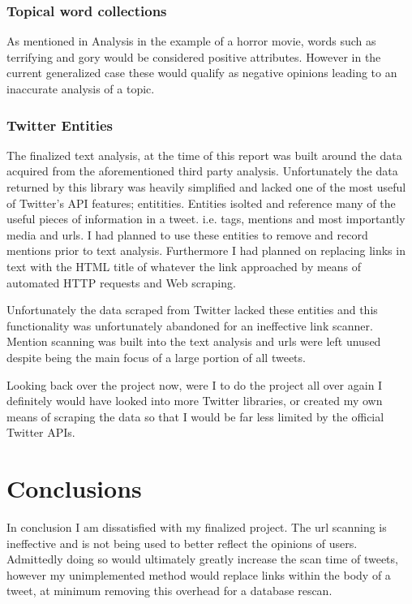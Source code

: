 \documentclass[12pt,a4paper]{report}
\begin{document}
    \subsection{Topical word collections}
    As mentioned in Analysis in the example of a horror movie, words such as terrifying and gory would be considered positive attributes. However in the current generalized case these would qualify as negative opinions leading to an inaccurate analysis of a topic.
    \subsection{Twitter Entities}
    The finalized text analysis, at the time of this report was built around the data acquired from the aforementioned third party analysis. Unfortunately the data returned by this library was heavily simplified and lacked one of the most useful of Twitter's API features; entitities\cite{TwitterEntities}. Entities isolted and reference many of the useful pieces of information in a tweet. i.e. tags, mentions and most importantly media and urls. I had planned to use these entities to remove and record mentions prior to text analysis. Furthermore I had planned on replacing links in text with the HTML title of whatever the link approached by means of automated HTTP requests and Web scraping.
    \par
    Unfortunately the data scraped from Twitter lacked these entities and this functionality was unfortunately abandoned for an ineffective link scanner. Mention scanning was built into the text analysis and urls were left unused despite being the main focus of a large portion of all tweets.
  \par
  Looking back over the project now, were I to do the project all over again I definitely would have looked into more Twitter libraries, or created my own means of scraping the data so that I would be far less limited by the official Twitter APIs.

\chapter{Conclusions}
  In conclusion I am dissatisfied with my finalized project. The url scanning is ineffective and is not being used to better reflect the opinions of users. Admittedly doing so would ultimately greatly increase the scan time of tweets, however my unimplemented method would replace links within the body of a tweet, at minimum removing this overhead for a database rescan.
\end{document}
